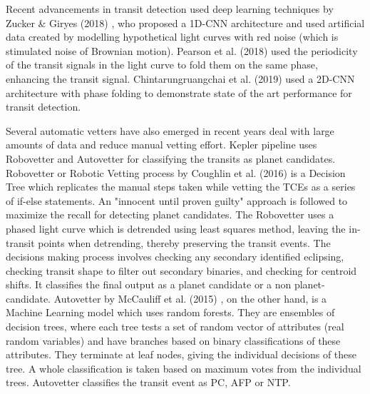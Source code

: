 Recent advancements in transit detection used deep learning techniques by Zucker \& Giryes (2018) \cite{zucker}, who proposed a 1D-CNN architecture and used artificial data created by modelling hypothetical light curves with red noise (which is stimulated noise of Brownian motion). Pearson et al. (2018) \cite{pearson} used the periodicity of the transit signals in the light curve to fold them on the same phase, enhancing the transit signal. Chintarungruangchai et al. (2019) \cite{2dcnn} used a 2D-CNN architecture with phase folding to demonstrate state of the art performance for transit detection.

Several automatic vetters have also emerged in recent years deal with large amounts of data and reduce manual vetting effort. Kepler pipeline uses Robovetter and Autovetter for classifying the transits as planet candidates. Robovetter or Robotic Vetting process by Coughlin et al. (2016) \cite{robovetter} is a Decision Tree which replicates the manual steps taken while vetting the TCEs as a series of if-else statements. An "innocent until proven guilty" approach is followed to maximize the recall for detecting planet candidates. The Robovetter uses a phased light curve which is detrended using least squares method, leaving the in-transit points when detrending, thereby preserving the transit events. The decisions making process involves checking any secondary identified eclipsing, checking transit shape to filter out secondary binaries, and checking for centroid shifts. It classifies the final output as a planet candidate or a non planet-candidate. Autovetter by McCauliff et al. (2015) \cite{autovetter}, on the other hand, is a Machine Learning model which uses random forests. They are ensembles of decision trees, where each tree tests a set of random vector of attributes (real random variables) and have branches based on binary classifications of these attributes. They terminate at leaf nodes, giving the individual decisions of these tree. A whole classification is taken based on maximum votes from the individual trees. Autovetter classifies the transit event as PC, AFP or NTP.

